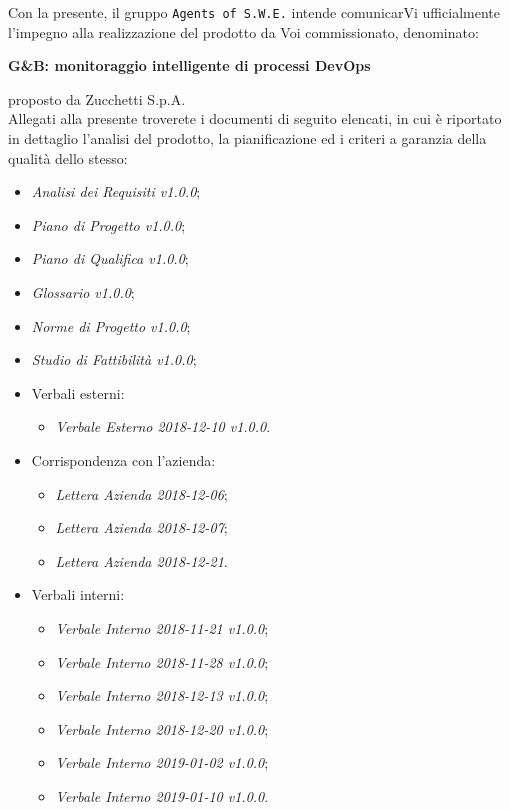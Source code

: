 \documentclass[11pt, a4paper]{letter} %
\begin{document}
\begin{letter}
Con la presente, il gruppo \texttt{Agents of S.W.E.} intende comunicarVi ufficialmente l'impegno alla realizzazione del prodotto da Voi commissionato, denominato:
\begin{center}
	\textbf{G\&B: monitoraggio intelligente di processi DevOps}
\end{center}
proposto da Zucchetti S.p.A.\\
Allegati alla presente troverete i documenti di seguito elencati, in cui è riportato in dettaglio l'analisi del prodotto, la pianificazione ed i criteri a garanzia della qualità dello stesso:
\begin{itemize}
	\item \textit{Analisi dei Requisiti v1.0.0};
	\item  \textit{Piano di Progetto v1.0.0};
	\item \textit{Piano di Qualifica v1.0.0};
	\item \textit{Glossario v1.0.0};
	\item \textit{Norme di Progetto v1.0.0};	
	\item \textit{Studio di Fattibilità v1.0.0};
	\item Verbali esterni: 
		\begin{itemize}
			\item \textit{Verbale Esterno 2018-12-10 v1.0.0}.
		\end{itemize}
	\item Corrispondenza con l'azienda: 
		\begin{itemize}
			\item \textit{Lettera Azienda 2018-12-06};
			\item \textit{Lettera Azienda 2018-12-07};
			\item \textit{Lettera Azienda 2018-12-21}.
		\end{itemize}
	\item Verbali interni: 
		\begin{itemize}
			\item \textit{Verbale Interno 2018-11-21 v1.0.0};
			\item \textit{Verbale Interno 2018-11-28 v1.0.0};
			\item \textit{Verbale Interno 2018-12-13 v1.0.0};
			\item \textit{Verbale Interno 2018-12-20 v1.0.0};
			\item \textit{Verbale Interno 2019-01-02 v1.0.0};
			\item \textit{Verbale Interno 2019-01-10 v1.0.0}.
		\end{itemize}

\end{itemize}
\end{letter}
\end{document}
